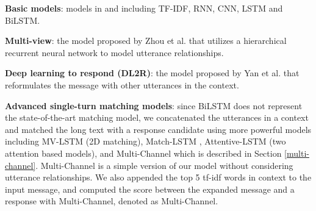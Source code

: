 \documentclass[11pt,a4paper]{article}
\begin{document}
	\textbf{Basic models}: models in \cite{lowe2015ubuntu} and \cite{kadlec2015improved} including TF-IDF, RNN, CNN, LSTM and BiLSTM. 
	
	\textbf{Multi-view}: the model proposed by Zhou et al.  that utilizes a hierarchical recurrent neural network to model utterance relationships. 

	\textbf{Deep learning to respond (DL2R)}: the model proposed by Yan et al.  that reformulates the message with other utterances in the context.
	
	\textbf{Advanced single-turn matching models}: since  BiLSTM does not represent the state-of-the-art matching model, we concatenated the utterances in a context and matched the long text with a response candidate using more powerful models including MV-LSTM \cite{wan2016match} (2D matching), Match-LSTM \cite{wang2015learning}, Attentive-LSTM \cite{tan2015lstm} (two attention based models), and Multi-Channel which is described in Section \ref{multi-channel}. Multi-Channel is a simple version of our model without considering utterance relationships. We also appended the top 5 tf-idf words in context to the input message, and computed the score between the expanded message and a response with Multi-Channel, denoted as Multi-Channel.
	
\end{document}
